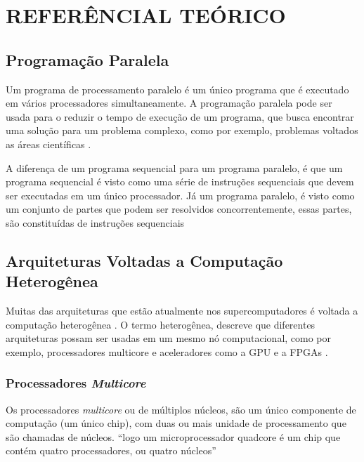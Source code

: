 
\chapter{REFERÊNCIAL TEÓRICO}
\label{chap:ref-teorico}

\section{Programação Paralela}

Um programa de processamento paralelo é um único programa que é executado em vários processadores simultaneamente.
A programação paralela pode ser usada para o reduzir o tempo de execução de um programa,
que busca encontrar uma solução para um problema complexo, como por exemplo, problemas voltados as áreas científicas \cite{hennessy2014organizaccao}.

A diferença de um programa sequencial para um programa paralelo, é que um programa sequencial é visto como uma série de instruções
sequenciais que devem ser executadas em um único processador.
Já um programa paralelo, é visto como um conjunto de partes que podem ser resolvidos concorrentemente,
essas partes, são constituídas de instruções sequenciais \cite{hennessy2014organizaccao,tanenbaum20103a}

\section{Arquiteturas Voltadas a Computação Heterogênea}
Muitas das arquiteturas que estão atualmente nos supercomputadores é voltada a computação heterogênea \cite{meuer2014top500}.
O termo heterogênea, descreve que diferentes arquiteturas possam ser usadas em um mesmo nó computacional, como por exemplo, processadores multicore e aceleradores como a GPU e a FPGAs \cite{intrArqHete:2012}.

\subsection{Processadores \textit{Multicore}}
Os processadores \textit{multicore} ou de múltiplos núcleos, são um único componente de computação (um único chip), com duas ou mais unidade de processamento que são chamadas de núcleos. \cite{blake2009survey}
“logo um microprocessador quadcore é um chip que contém quatro processadores, ou quatro núcleos” \cite[p.~31]{hennessy2014organizaccao}


